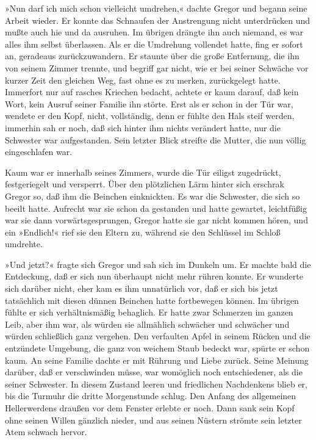 »Nun darf ich mich schon vielleicht umdrehen,« dachte Gregor und begann
seine Arbeit wieder. Er konnte das Schnaufen der Anstrengung nicht
unterdrücken und mußte auch hie und da ausruhen. Im übrigen drängte ihn
auch niemand, es war alles ihm selbst überlassen. Als er die Umdrehung
vollendet hatte, fing er sofort an, geradeaus zurückzuwandern. Er
staunte über die große Entfernung, die ihn von seinem Zimmer trennte,
und begriff gar nicht, wie er bei seiner Schwäche vor kurzer Zeit den
gleichen Weg, fast ohne es zu merken, zurückgelegt hatte. Immerfort nur
auf rasches Kriechen bedacht, achtete er kaum darauf, daß kein Wort,
kein Ausruf seiner Familie ihn störte. Erst als er schon in der Tür war,
wendete er den Kopf, nicht, vollständig, denn er fühlte den Hals steif
werden, immerhin sah er noch, daß sich hinter ihm nichts verändert
hatte, nur die Schwester war aufgestanden. Sein letzter Blick streifte
die Mutter, die nun völlig eingeschlafen war.

Kaum war er innerhalb seines Zimmers, wurde die Tür eiligst zugedrückt,
festgeriegelt und versperrt. Über den plötzlichen Lärm hinter sich
erschrak Gregor so, daß ihm die Beinchen einknickten. Es war die
Schwester, die sich so beeilt hatte. Aufrecht war sie schon da
gestanden und hatte gewartet, leichtfüßig war sie dann
vorwärtsgesprungen, Gregor hatte sie gar nicht kommen hören, und ein
»Endlich!« rief sie den Eltern zu, während sie den Schlüssel im Schloß
umdrehte.

»Und jetzt?« fragte sich Gregor und sah sich im Dunkeln um. Er machte
bald die Entdeckung, daß er sich nun überhaupt nicht mehr rühren konnte.
Er wunderte sich darüber nicht, eher kam es ihm unnatürlich vor, daß er
sich bis jetzt tatsächlich mit diesen dünnen Beinchen hatte fortbewegen
können. Im übrigen fühlte er sich verhältnismäßig behaglich. Er hatte
zwar Schmerzen im ganzen Leib, aber ihm war, als würden sie allmählich
schwächer und schwächer und würden schließlich ganz vergehen. Den
verfaulten Apfel in seinem Rücken und die entzündete Umgebung, die ganz
von weichem Staub bedeckt war, spürte er schon kaum. An seine Familie
dachte er mit Rührung und Liebe zurück. Seine Meinung darüber, daß er
verschwinden müsse, war womöglich noch entschiedener, als die seiner
Schwester. In diesem Zustand leeren und friedlichen Nachdenkens blieb
er, bis die Turmuhr die dritte Morgenstunde schlug. Den Anfang des
allgemeinen Hellerwerdens draußen vor dem Fenster erlebte er noch. Dann
sank sein Kopf ohne seinen Willen gänzlich nieder, und aus seinen
Nüstern strömte sein letzter Atem schwach hervor.

